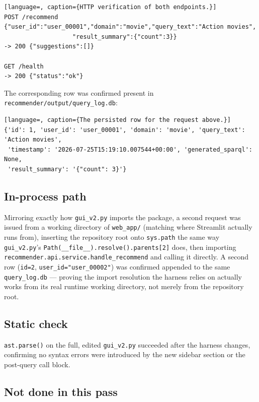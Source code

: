 \documentclass[11pt,a4paper]{article}
\newcommand{\code}[1]{\texttt{#1}}
\begin{document}
\begin{lstlisting}[language=, caption={HTTP verification of both endpoints.}]
POST /recommend  {"user_id":"user_00001","domain":"movie","query_text":"Action movies",
                   "result_summary":{"count":3}}
-> 200 {"suggestions":[]}

GET /health
-> 200 {"status":"ok"}
\end{lstlisting}

The corresponding row was confirmed present in \code{recommender/output/query\_log.db}:

\begin{lstlisting}[language=, caption={The persisted row for the request above.}]
{'id': 1, 'user_id': 'user_00001', 'domain': 'movie', 'query_text': 'Action movies',
 'timestamp': '2026-07-25T15:19:10.007544+00:00', 'generated_sparql': None,
 'result_summary': '{"count": 3}'}
\end{lstlisting}

\subsection{In-process path}

Mirroring exactly how \code{gui\_v2.py} imports the package, a second request was issued from a
working directory of \code{web\_app/} (matching where Streamlit actually runs from), inserting the
repository root onto \code{sys.path} the same way \code{gui\_v2.py}'s
\code{Path(\_\_file\_\_).resolve().parents[2]} does, then importing
\code{recommender.api.service.handle\_recommend} and calling it directly. A second row
(\code{id=2}, \code{user\_id="user\_00002"}) was confirmed appended to the same
\code{query\_log.db} --- proving the import resolution the harness relies on actually works from
its real runtime working directory, not merely from the repository root.

\subsection{Static check}

\code{ast.parse()} on the full, edited \code{gui\_v2.py} succeeded after the harness changes,
confirming no syntax errors were introduced by the new sidebar section or the post-query call
block.

\subsection{Not done in this pass}
\end{document}
